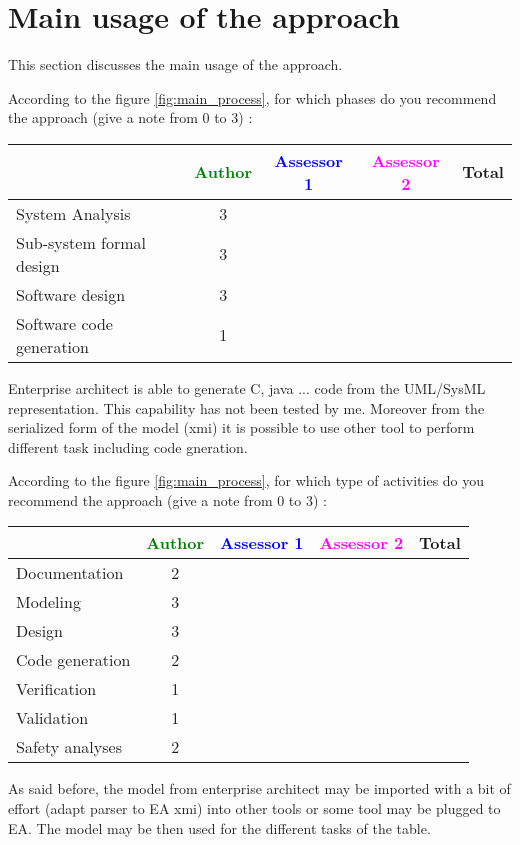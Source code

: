 \section{Main usage of the approach}
\label{main_usage}
This section discusses the main usage of the approach.

According to the figure \ref{fig:main_process}, for which phases do you recommend the approach (give a note from 0 to  3) :

\begin{tabular}{|l | c | c | c | c|}
\hline
& \textcolor{green}{Author} & \textcolor{blue}{Assessor 1} & \textcolor{magenta}{Assessor 2} & Total \\
\hline 
System Analysis & 3  & & &  \\
\hline
Sub-system formal design & 3 & & & \\
\hline
Software design & 3 & & & \\
\hline
Software code generation & 1 & & & \\
\hline
\end{tabular}
\begin{author_comment}
Enterprise architect is able to generate C, java ... code from the UML/SysML
representation. This capability has not been tested by me. Moreover
from the serialized form of the model (xmi) it is possible to use
other tool to perform different task including code gneration.
\end{author_comment}
According to the figure \ref{fig:main_process}, for which type of activities do you recommend the approach (give a note from 0 to  3) :

\begin{tabular}{|l | c | c | c | c|}
\hline
& \textcolor{green}{Author} & \textcolor{blue}{Assessor 1} & \textcolor{magenta}{Assessor 2} & Total \\
\hline 
Documentation &2 & & &  \\
\hline
Modeling & 3& & &  \\
\hline
Design &3 & & & \\
\hline
Code generation &2 & & & \\
\hline
Verification & 1 & & & \\
\hline
Validation & 1 & & & \\
\hline
Safety analyses & 2  & & & \\
\hline
\end{tabular}
\begin{author_comment}
As said before, the model from enterprise architect may be imported
with a bit of effort (adapt parser to EA xmi) into other tools or some
tool may be plugged to EA. The model may be then used for the
different tasks of the table.
\end{author_comment}


